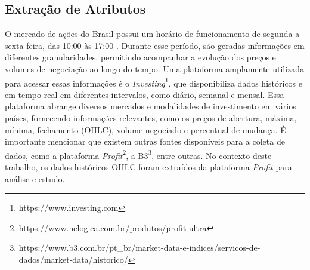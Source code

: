 \subsection{Extração de Atributos}
\label{subsec:extracao}
O mercado de ações do Brasil possui um horário de funcionamento de segunda a sexta-feira, das 10:00 às 17:00 \cite{B3H:2023}. Durante esse período, são geradas informações em diferentes granularidades, permitindo acompanhar a evolução dos preços e volumes de negociação ao longo do tempo. Uma plataforma amplamente utilizada para acessar essas informações é o \textit{Investing}\footnote{https://www.investing.com}, que disponibiliza dados históricos e em tempo real em diferentes intervalos, como diário, semanal e mensal. Essa plataforma abrange diversos mercados e modalidades de investimento em vários países, fornecendo informações relevantes, como os preços de abertura, máxima, mínima, fechamento (OHLC), volume negociado e percentual de mudança. É importante mencionar que existem outras fontes disponíveis para a coleta de dados, como a plataforma \textit{Profit}\footnote{https://www.nelogica.com.br/produtos/profit-ultra}, a B3\footnote{https://www.b3.com.br/pt\_br/market-data-e-indices/servicos-de-dados/market-data/historico/}, entre outras. No contexto deste trabalho, os dados históricos \ac{OHLC} foram extraídos da plataforma \textit{Profit} para análise e estudo.

